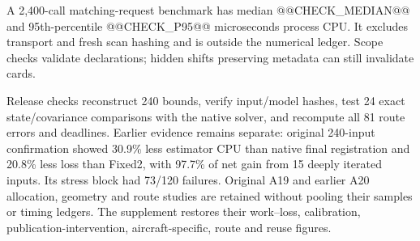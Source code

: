 A 2,400-call matching-request benchmark has median @@CHECK_MEDIAN@@ and 95th-percentile @@CHECK_P95@@ microseconds process CPU. It excludes transport and fresh scan hashing and is outside the numerical ledger. Scope checks validate declarations; hidden shifts preserving metadata can still invalidate cards.

Release checks reconstruct 240 bounds, verify input/model hashes, test 24 exact state/covariance comparisons with the native solver, and recompute all 81 route errors and deadlines. Earlier evidence remains separate: original 240-input confirmation showed 30.9\% less estimator CPU than native final registration and 20.8\% less loss than Fixed2, with 97.7\% of net gain from 15 deeply iterated inputs. Its stress block had 73/120 failures. Original A19 and earlier A20 allocation, geometry and route studies are retained without pooling their samples or timing ledgers. The supplement restores their work--loss, calibration, publication-intervention, aircraft-specific, route and reuse figures.
